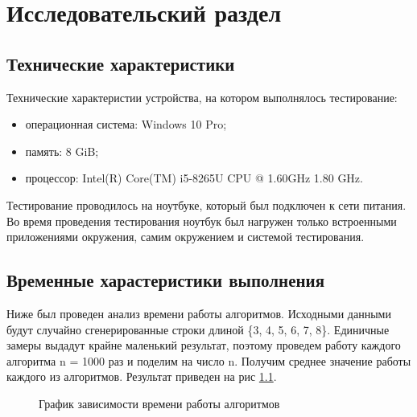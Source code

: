 \chapter{Исследовательский раздел}
\section{Технические характеристики}
Технические характеристии устройства, на котором выполнялось тестирование:
\begin{itemize}
	\item операционная система: Windows 10 Pro;
	\item память: 8 GiB;
	\item процессор: Intel(R) Core(TM) i5-8265U CPU @ 1.60GHz   1.80 GHz.
\end{itemize}
Тестирование проводилось на ноутбуке, который был подключен к сети питания. Во время проведения тестирования ноутбук был нагружен только встроенными приложениями окружения, самим окружением и системой тестирования.

\section{Временные харастеристики выполнения}
Ниже был проведен анализ времени работы алгоритмов. Исходными данными будут случайно сгенерированные строки длиной \{3, 4, 5, 6, 7, 8\}. Единичные замеры выдадут крайне маленький результат, поэтому  проведем работу каждого алгоритма n = 1000 раз и поделим на число n. Получим среднее значение работы каждого из алгоритмов. Результат приведен на рис \ref{fg:6_1}.

\begin{figure}[H]
	\centering
	\caption{График зависимости времени работы алгоритмов } 
	\label{fg:6_1}
\end{figure} 

